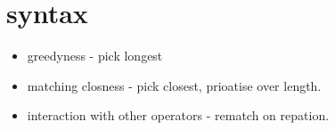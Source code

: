 \section{syntax}
\begin{itemize}
	\item greedyness - pick longest
	\item matching closness - pick closest, prioatise over length.
	\item interaction with other operators - rematch on repation.
\end{itemize}
